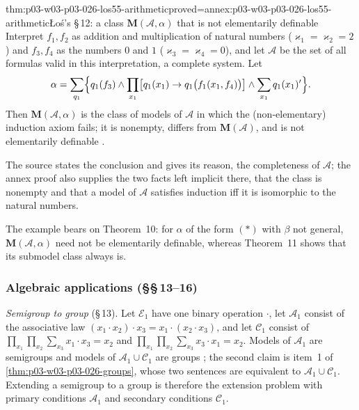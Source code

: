 \begin{hbtheorem}{thm:p03-w03-p03-026-los55-arithmetic}{proved=annex:p03-w03-p03-026-los55-arithmetic}{\L o\'s's \S\,12: a class \(\mathbf M(\mathcal A,\alpha)\) that is not elementarily definable}
Interpret \(f_1,f_2\) as addition and multiplication of natural numbers
(\(\varkappa_1=\varkappa_2=2\)) and \(f_3,f_4\) as the numbers \(0\) and \(1\)
(\(\varkappa_3=\varkappa_4=0\)), and let \(\mathcal A\) be the set of all
formulas valid in this interpretation, a complete system.  Let
\begin{equation*}
 \alpha=\sum_{q_1}\Bigl\{q_1(f_3)\land\prod_{x_1}\bigl[q_1(x_1)\to q_1\bigl(f_1(x_1,f_4)\bigr)\bigr]\land\sum_{x_1}q_1(x_1)'\Bigr\}.
\end{equation*}
Then \(\mathbf M(\mathcal A,\alpha)\) is the class of models of \(\mathcal A\)
in which the (non-elementary) induction axiom fails; it is nonempty, differs
from \(\mathbf M(\mathcal A)\), and is not elementarily definable
\cite[p.~50]{Los1955}.
\end{hbtheorem}

The source states the conclusion and gives its reason, the completeness of
\(\mathcal A\); the annex proof also supplies the two facts left implicit
there, that the class is nonempty and that a model of \(\mathcal A\)
satisfies induction iff it is isomorphic to the natural numbers.

The example bears on Theorem~10: for \(\alpha\) of the form \((*)\) with
\(\beta\) not general, \(\mathbf M(\mathcal A,\alpha)\) need not be
elementarily definable, whereas Theorem~11 shows that its submodel class
always is.

\subsubsection{Algebraic applications (\S\S\,13--16)}

\emph{Semigroup to group} (\S\,13).  Let \(\mathcal E_1\) have one binary
operation \(\cdot\), let \(\mathcal A_1\) consist of the associative law
\((x_1\cdot x_2)\cdot x_3=x_1\cdot(x_2\cdot x_3)\), and let \(\mathcal C_1\)
consist of
\(\prod_{x_1}\prod_{x_2}\sum_{x_3}x_1\cdot x_3=x_2\) and
\(\prod_{x_1}\prod_{x_2}\sum_{x_3}x_3\cdot x_1=x_2\).  Models of
\(\mathcal A_1\) are semigroups and models of
\(\mathcal A_1\cup\mathcal C_1\) are groups \cite[pp.~50--51]{Los1955}; the
second claim is item~1 of \cref{thm:p03-w03-p03-026-groups}, whose two
sentences are equivalent to \(\mathcal A_1\cup\mathcal C_1\).  Extending a
semigroup to a group is therefore the extension problem with primary
conditions \(\mathcal A_1\) and secondary conditions \(\mathcal C_1\).

